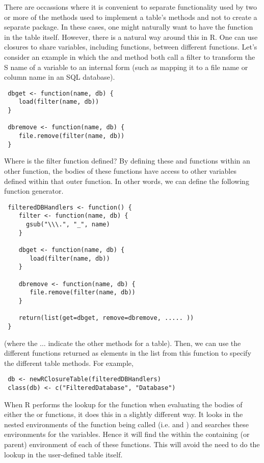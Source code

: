 \documentclass{article}
\begin{document}
There are occassions where it is convenient to separate functionality
used by two or more of the methods used to implement a table's methods
and not to create a separate package. In these cases, one might
naturally want to have the function in the table itself.  However,
there is a natural way around this in R.  One can use closures to
share variables, including functions, between different functions.
Let's consider an example in which the  and
 method both call a filter to transform the S name
of a variable to an internal form (such as mapping it to a file name or
column name in an SQL database).
\begin{verbatim}
 dbget <- function(name, db) {
    load(filter(name, db))
 }

 dbremove <- function(name, db) {
    file.remove(filter(name, db))
 }
\end{verbatim}
Where is the filter function defined?
By defining these
 and 
functions within an other function, 
the bodies of these functions have access to
other variables defined within that outer function.
In other words, we can define the following
function generator.
\begin{verbatim}
 filteredDBHandlers <- function() {
    filter <- function(name, db) {
      gsub("\\\.", "_", name)
    }

    dbget <- function(name, db) {
       load(filter(name, db))
    }
    
    dbremove <- function(name, db) {
       file.remove(filter(name, db))
    }

    return(list(get=dbget, remove=dbremove, ..... ))
 }
\end{verbatim}
(where the $\ldots$ indicate the other methods for a table).
Then, we can use the different functions returned as elements in the
list from this function to specify 
the different table methods.
For example,
\begin{verbatim}
 db <- newRClosureTable(filteredDBHandlers)
 class(db) <- c("FilteredDatabase", "Database")
\end{verbatim}

When R performs the lookup for the  function when
evaluating the bodies of either the  or
 functions, it does this in a slightly different
way.  It looks in the nested environments of the function being called
(i.e.  and ) and searches these
environments for the variables.  Hence it will find the
 within the containing (or parent) environment of
each of these functions. This will avoid the need to do the lookup in
the user-defined table itself.
\end{document}
